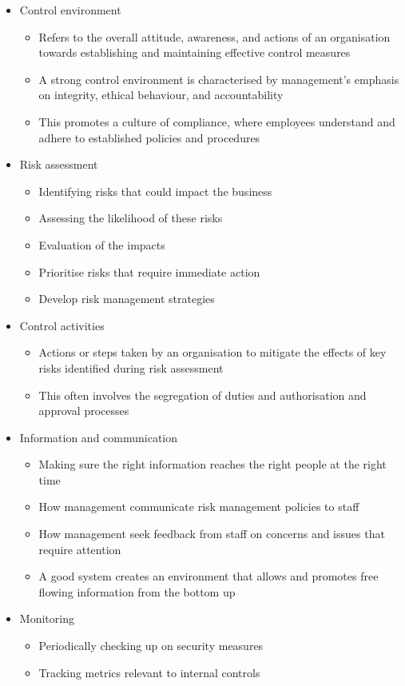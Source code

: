 \documentclass{article}
\begin{document}
		\begin{itemize}
			\item Control environment
				\begin{itemize}
					\item Refers to the overall attitude, awareness, and actions of an organisation towards establishing and maintaining effective control measures
					\item A strong control environment is characterised by management's emphasis on integrity, ethical behaviour, and accountability
					\item This promotes a culture of compliance, where employees understand and adhere to established policies and procedures
				\end{itemize}
			\item Risk assessment
				\begin{itemize}
					\item Identifying risks that could impact the business
					\item Assessing the likelihood of these risks
					\item Evaluation of the impacts
					\item Prioritise risks that require immediate action
					\item Develop risk management strategies
				\end{itemize}
			\item Control activities
				\begin{itemize}
					\item Actions or steps taken by an organisation to mitigate the effects of key risks identified during risk assessment
					\item This often involves the segregation of duties and authorisation and approval processes
				\end{itemize}
			\item Information and communication
				\begin{itemize}
					\item Making sure the right information reaches the right people at the right time
					\item How management communicate risk management policies to staff
					\item How management seek feedback from staff on concerns and issues that require attention
					\item A good system creates an environment that allows and promotes free flowing information from the bottom up
				\end{itemize}
			\item Monitoring
				\begin{itemize}
					\item Periodically checking up on security measures
					\item Tracking metrics relevant to internal controls
				\end{itemize}
		\end{itemize}
\end{document}
